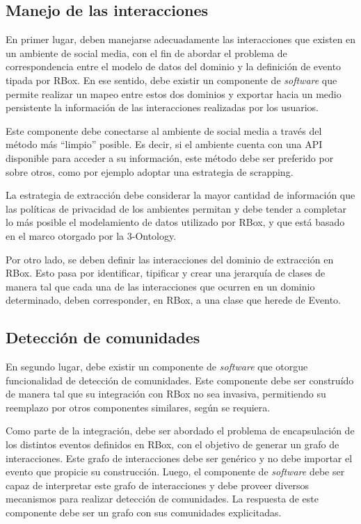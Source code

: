 \subsection{Manejo de las interacciones}

En primer lugar, deben manejarse adecuadamente las interacciones que existen en un ambiente de social media, con el fin de abordar el problema de correspondencia entre el modelo de datos del dominio y la definición de evento tipada por RBox. En ese sentido, debe existir un componente de \textit{software} que permite realizar un mapeo entre estos dos dominios y exportar hacia un medio persistente la información de las interacciones realizadas por los usuarios.

Este componente debe conectarse al ambiente de social media a través del método más “limpio” posible. Es decir, si el ambiente cuenta con una API disponible para acceder a su información, este método debe ser preferido por sobre otros, como por ejemplo adoptar una estrategia de scrapping.

La estrategia de extracción debe considerar la mayor cantidad de información que las políticas de privacidad de los ambientes permitan y debe tender a completar lo más posible el modelamiento de datos utilizado por RBox, y que está basado en el marco otorgado por la 3-Ontology.

Por otro lado, se deben definir las interacciones del dominio de extracción en RBox. Esto pasa por identificar, tipificar y crear una jerarquía de clases de manera tal que cada una de las interacciones que ocurren en un dominio determinado, deben corresponder, en RBox, a una clase que herede de Evento.

\subsection{Detección de comunidades}

En segundo lugar, debe existir un componente de \textit{software} que otorgue funcionalidad de detección de comunidades. Este componente debe ser construído de manera tal que su integración con RBox no sea invasiva, permitiendo su reemplazo por otros componentes similares, según se requiera.

Como parte de la integración, debe ser abordado el problema de encapsulación de los distintos eventos definidos en RBox, con el objetivo de generar un grafo de interacciones. Este grafo de interacciones debe ser genérico y no debe importar el evento que propicie su construcción. Luego, el componente de \textit{software} debe ser capaz de interpretar este grafo de interacciones y debe proveer diversos mecanismos para realizar detección de comunidades. La respuesta de este componente debe ser un grafo con sus comunidades explicitadas.

